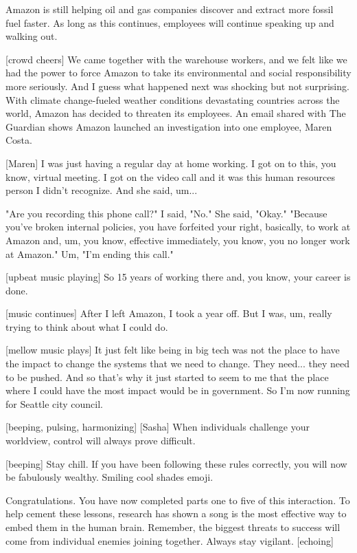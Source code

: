 \documentclass[a4paper]{article}
\begin{document}
	
	Amazon is still helping oil and gas companies discover and extract more fossil fuel faster.
	As long as this continues, employees will continue speaking up and walking out.
	
	
	[crowd cheers]
	We came together with the warehouse workers, and we felt like we had the power to force Amazon to take its environmental and social responsibility more seriously.
	And I guess what happened next was shocking but not surprising.
	With climate change-fueled weather conditions devastating countries across the world, Amazon has decided to threaten its employees.
    An email shared with The Guardian shows Amazon launched an investigation into one employee, Maren Costa.
	
	
	[Maren] I was just having a regular day at home working.
	I got on to this, you know, virtual meeting.
	I got on the video call and it was this human resources person
	I didn't recognize.
	And she said, um...
	
	
	
	"Are you recording this phone call?"
	I said, "No." She said, "Okay."
	"Because you've broken internal policies, you have forfeited your right, basically, to work at Amazon and, um, you know, effective immediately, you know, you no longer work at Amazon."
	Um, "I'm ending this call."
	
	
	[upbeat music playing]
	So 15 years of working there and, you know, your career is done.
	
	
	[music continues]
	After I left Amazon, I took a year off.
	But I was, um, really trying to think about what I could do.
	
	
	[mellow music plays]
	It just felt like being in big tech was not the place to have the impact to change the systems that we need to change.
	They need... they need to be pushed.
	And so that's why it just started to seem to me that the place where I could have the most impact would be in government.
	So I'm now running for Seattle city council.
	
	
	
	[beeping, pulsing, harmonizing]
	[Sasha] When individuals challenge your worldview, control will always prove difficult.
	
	
	[beeping]
	Stay chill.
	If you have been following these rules correctly, you will now be fabulously wealthy.
	Smiling cool shades emoji.
	
	
	
	Congratulations.
	You have now completed parts one to five of this interaction.
	To help cement these lessons, research has shown a song is the most effective way to embed them in the human brain.
	Remember, the biggest threats to success will come from individual enemies joining together.
	Always stay vigilant. [echoing]
	
\end{document}
